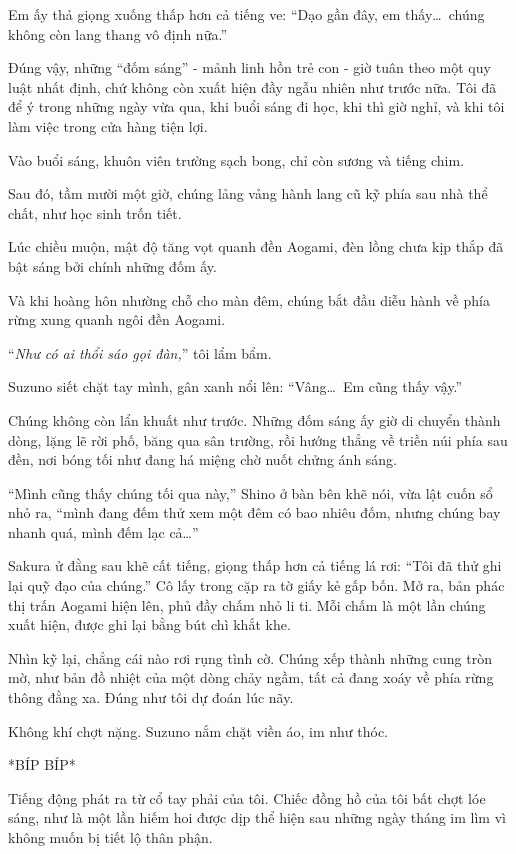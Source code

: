 \documentclass[../main.tex]{subfiles}
\begin{document}
Em ấy thả giọng xuống thấp hơn cả tiếng ve: ``Dạo gần đây, em thấy\dots\ chúng không còn lang thang vô định nữa.''

Đúng vậy, những ``đốm sáng'' - mảnh linh hồn trẻ con - giờ tuân theo một quy luật nhất định, chứ không còn xuất hiện đầy ngẫu nhiên như trước nữa. Tôi đã để ý trong những ngày vừa qua, khi buổi sáng đi học, khi thì giờ nghỉ, và khi tôi làm việc trong cửa hàng tiện lợi.

Vào buổi sáng, khuôn viên trường sạch bong, chỉ còn sương và tiếng chim.

Sau đó, tầm mười một giờ, chúng lảng vảng hành lang cũ kỹ phía sau nhà thể chất, như học sinh trốn tiết.

Lúc chiều muộn, mật độ tăng vọt quanh đền Aogami, đèn lồng chưa kịp thắp đã bật sáng bởi chính những đốm ấy.

Và khi hoàng hôn nhường chỗ cho màn đêm, chúng bắt đầu diễu hành về phía rừng xung quanh ngôi đền Aogami.

``\textit{Như có ai thổi sáo gọi đàn,}'' tôi lẩm bẩm.

Suzuno siết chặt tay mình, gân xanh nổi lên: ``Vâng\dots\ Em cũng thấy vậy.''

Chúng không còn lẩn khuất như trước. Những đốm sáng ấy giờ di chuyển thành dòng, lặng lẽ rời phố, băng qua sân trường, rồi hướng thẳng về triền núi phía sau đền, nơi bóng tối như đang há miệng chờ nuốt chửng ánh sáng.

``Mình cũng thấy chúng tối qua này,'' Shino ở bàn bên khẽ nói, vừa lật cuốn sổ nhỏ ra, ``mình đang đếm thử xem một đêm có bao nhiêu đốm, nhưng chúng bay nhanh quá, mình đếm lạc cả\dots''

Sakura ử đằng sau khẽ cất tiếng, giọng thấp hơn cả tiếng lá rơi: ``Tôi đã thử ghi lại quỹ đạo của chúng.'' Cô lấy trong cặp ra tờ giấy kẻ gấp bốn. Mở ra, bản phác thị trấn Aogami hiện lên, phủ đầy chấm nhỏ li ti. Mỗi chấm là một lần chúng xuất hiện, được ghi lại bằng bút chì khắt khe.

Nhìn kỹ lại, chẳng cái nào rơi rụng tình cờ. Chúng xếp thành những cung tròn mờ, như bản đồ nhiệt của một dòng chảy ngầm, tất cả đang xoáy về phía rừng thông đằng xa. Đúng như tôi dự đoán lúc nãy.

Không khí chợt nặng. Suzuno nắm chặt viền áo, im như thóc.

*BÍP BÍP*

Tiếng động phát ra từ cổ tay phải của tôi. Chiếc đồng hồ của tôi bất chợt lóe sáng, như là một lần hiếm hoi được dịp thể hiện sau những ngày tháng im lìm vì không muốn bị tiết lộ thân phận.
\end{document}
